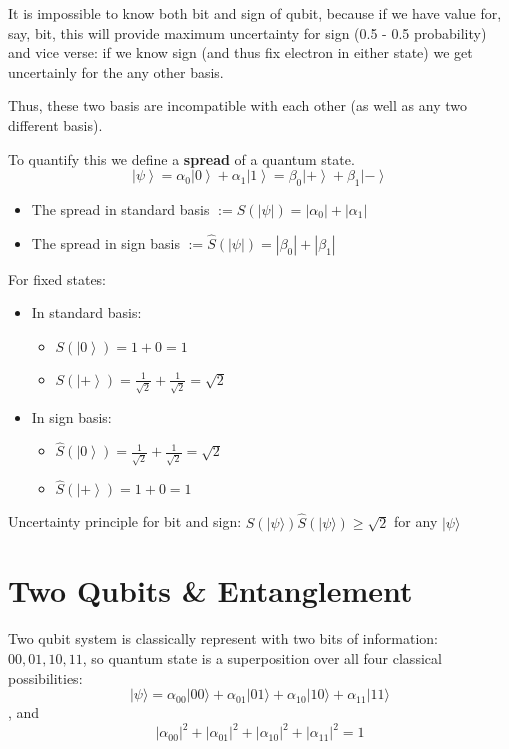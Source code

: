 \documentclass{scrartcl}
\newcommand{\ket}[1]{\left| #1 \right>} %
\begin{document}
It is impossible to know both bit and sign of qubit, because if we have value
for, say, bit, this will provide maximum uncertainty for sign (0.5 - 0.5
probability) and vice verse: if we know sign (and thus fix electron in either
state) we get uncertainly for the any other basis.

Thus, these two basis are incompatible with each other (as well as any two
different basis).

To quantify this we define a {\bf spread} of a quantum state.
\[\ket\psi = \alpha_0 \ket0 + \alpha_1 \ket1 = \beta_0 \ket+ + \beta_1
\ket- \]
\begin{itemize}
\item The spread in standard basis $:= S(|\psi|) = |\alpha_0| + |\alpha_1|$
\item The spread in sign basis $:= \hat{S}(|\psi|) = |\beta_0| + |\beta_1|$
\end{itemize}
For fixed states:
\begin{itemize}
\item In standard basis:
  \begin{itemize}
  \item $S(\ket0) = 1 + 0 = 1$
  \item $S(\ket+) = \frac1{\sqrt{2}} + \frac1{\sqrt{2}} = \sqrt{2}$
  \end{itemize}
\item In sign basis:
  \begin{itemize}
  \item $\hat{S}(\ket0) = \frac1{\sqrt{2}} + \frac1{\sqrt{2}} = \sqrt{2}$
  \item $\hat{S}(\ket+) = 1 + 0 = 1$
  \end{itemize}
\end{itemize}

Uncertainty principle for bit and sign: $S(|\psi\rangle) \hat{S}(|\psi\rangle)
\geq \sqrt{2}$ for any $|\psi\rangle$

\section{Two Qubits \& Entanglement}
\label{sec:week 2}
Two qubit system is classically represent with two bits of information: $00, 01,
10, 11$, so quantum state is a superposition over all four classical
possibilities: $$|\psi \rangle = \alpha_{00}|00\rangle + \alpha_{01}|01\rangle +
\alpha_{10}|10\rangle + \alpha_{11}|11\rangle $$, and $$|\alpha_{00}|^2 +
|\alpha_{01}|^2 + |\alpha_{10}|^2 + |\alpha_{11}|^2 = 1$$
 
\end{document}

